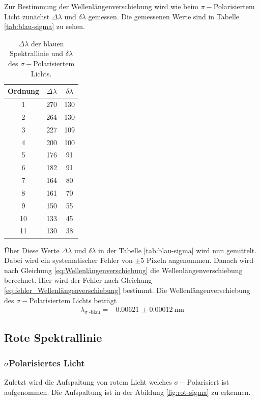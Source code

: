 Zur Bestimmung der Wellenlängenverschiebung wird wie beim $\pi -$Polarisiertem Licht zunächst $\Delta \lambda$ und $\delta \lambda$ gemessen.
Die gemessenen Werte sind in Tabelle \autoref{tab:blau-sigma} zu sehen.

\begin{table}
    \centering
    \caption{$\Delta \lambda$ der blauen Spektrallinie und $\delta \lambda$ des $\sigma -$Polarisiertem Lichts.}
    \begin{tabular}{ccc}
        \toprule
        Ordnung & $\Delta \lambda$ & $\delta \lambda $  \\
        \midrule
        1   &   270  &    130   \\
        2   &   264  &    130   \\
        3   &   227  &    109   \\
        4   &   200  &    100   \\
        5   &   176  &    91    \\
        6   &   182  &    91    \\
        7   &   164  &    80    \\
        8   &   161  &    70    \\
        9   &   150  &    55    \\
        10  &   133  &    45    \\
        11  &   130  &    38    \\
        \bottomrule
    \end{tabular}
    \label{tab:blau-sigma}
\end{table}

Über Diese Werte $\Delta \lambda$ und $\delta \lambda$ in der Tabelle \autoref{tab:blau-sigma} wird nun gemittelt.
Dabei wird ein systematischer Fehler von $\pm 5$ Pixeln angenommen. 
Danach wird nach Gleichung \eqref{eq:Wellenlängenverschiebung} die Wellenlängenverschiebung berechnet.
Hier wird der Fehler nach Gleichung \eqref{eq:fehler_Wellenlängenverschiebung} bestimmt.
Die Wellenlängenverschiebung des $\sigma -$Polarisiertem Lichts beträgt
\begin{align*}
    \lambda _\text{$\sigma$ -blau} =& \SI{0.00621(012)}{\nano\meter}
\end{align*}

\subsection{Rote Spektrallinie}
\subsubsection{\texorpdfstring{$\sigma$}-Polarisiertes Licht}
Zuletzt wird die Aufspaltung von rotem Licht welches $\sigma -$Polarisiert ist aufgenommen.
Die Aufspaltung ist in der Abildung \autoref{fig:rot-sigma} zu erkennen.

